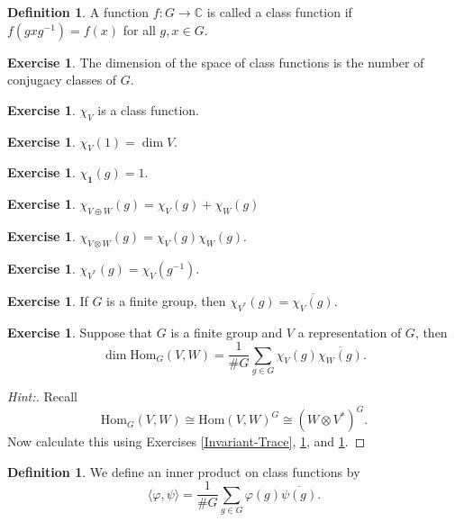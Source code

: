 \documentclass[11pt]{article}
\theoremstyle{plain}
\theoremstyle{definition}
\newtheorem{definition}[proposition]{Definition}
\newtheorem{exercise}[proposition]{Exercise}
\theoremstyle{remark}
\begin{document}
\begin{definition}
A function $f: G \rightarrow \mathbb{C}$ is called a class function if $f(gxg^{-1}) = f(x)$ for all $g, x \in G$.
\end{definition}

\begin{exercise}
The dimension of the space of class functions is the number of conjugacy classes of $G$.
\end{exercise}

\begin{exercise}
$\chi_V$ is a class function.
\end{exercise}

\begin{exercise}
$\chi_V(1) = \dim V.$
\end{exercise}

\begin{exercise}
$\chi_{\mathbf{1}}(g) = 1.$
\end{exercise}

\begin{exercise}
$\chi_{V \oplus W}(g) = \chi_V(g) + \chi_W(g)$
\end{exercise}

\begin{exercise} \label{tensor-character}
$\chi_{V \otimes W}(g) = \chi_V(g)  \chi_W(g)$.
\end{exercise}

\begin{exercise}
$\chi_{V^*}(g) = \chi_V(g^{-1})$.
\end{exercise}

\begin{exercise} \label{dual-character}
If $G$ is a finite group, then $\chi_{V^*}(g) = \overline{\chi_V(g)}$.
\end{exercise}


\begin{exercise}
Suppose that $G$ is a finite group and $V$ a representation of $G$, then
$$\dim \mathrm{Hom}_G(V,W) = \frac{1}{\# G} \sum_{g \in G} \chi_V(g) \overline{\chi_W(g)}.$$
\end{exercise}
\begin{proof}[Hint:]
Recall $$\mathrm{Hom}_G(V,W) \cong \mathrm{Hom}(V,W)^G \cong (W \otimes V^*)^G.$$  Now calculate this using Exercises \ref{Invariant-Trace}, \ref{tensor-character}, and \ref{dual-character}.
\end{proof}

\begin{definition}
We define an inner product on class functions by
$$\langle \varphi, \psi \rangle = \frac{1}{\# G} \sum_{g \in G} \varphi(g) \overline{\psi(g)}.$$
\end{definition}
\end{document}
